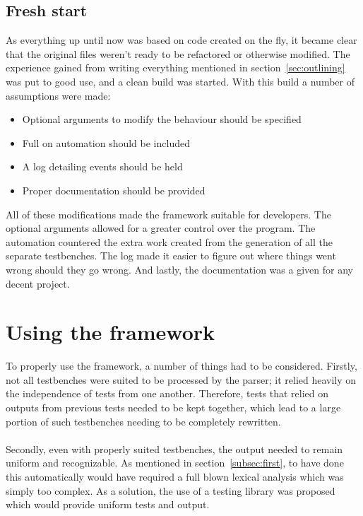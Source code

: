 \documentclass[11pt,british]{article}
\begin{document}
\subsection{Fresh start}
As everything up until now was based on code created on the fly, it became clear that the original files weren't ready to be refactored or otherwise modified. The experience gained from writing everything mentioned in section~\ref{sec:outlining} was put to good use, and a clean build was started. With this build a number of assumptions were made:
\begin{itemize}
\item Optional arguments to modify the behaviour should be specified
\item Full on automation should be included
\item A log detailing events should be held
\item Proper documentation should be provided
\end{itemize}
All of these modifications made the framework suitable for developers. The optional arguments allowed for a greater control over the program. The automation countered the extra work created from the generation of all the separate testbenches. The log made it easier to figure out where things went wrong should they go wrong. And lastly, the documentation was a given for any decent project.

\newpage{}
\section{Using the framework}
To properly use the framework, a number of things had to be considered. Firstly, not all testbenches were suited to be processed by the parser; it relied heavily on the independence of tests from one another. Therefore, tests that relied on outputs from previous tests needed to be kept together, which lead to a large portion of such testbenches needing to be completely rewritten.
\\
\\
Secondly, even with properly suited testbenches, the output needed to remain uniform and recognizable. As mentioned in section~\ref{subsec:first}, to have done this automatically would have required a full blown lexical analysis which was simply too complex. As a solution, the use of a testing library was proposed which would provide uniform tests and output.
\end{document}
